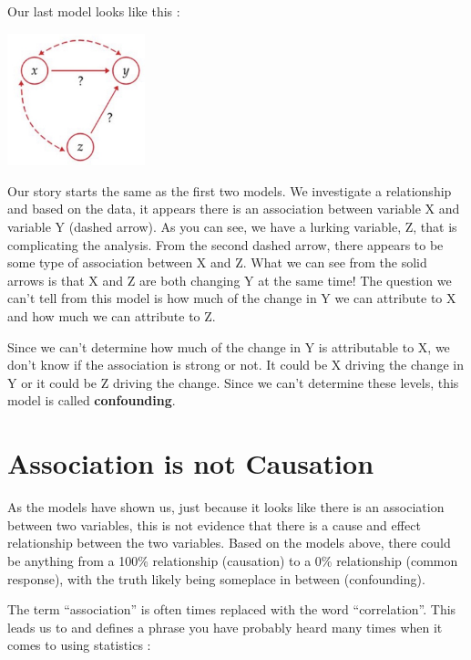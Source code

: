 \documentclass[
  letterpaper,
  DIV=11,
  numbers=noendperiod]{scrreprt}
\begin{document}

Our last model looks like this :

\includegraphics[width=0.3\textwidth,height=\textheight]{./images/IDV_3.jpg}

Our story starts the same as the first two models. We investigate a
relationship and based on the data, it appears there is an association
between variable X and variable Y (dashed arrow). As you can see, we
have a lurking variable, Z, that is complicating the analysis. From the
second dashed arrow, there appears to be some type of association
between X and Z. What we can see from the solid arrows is that X and Z
are both changing Y at the same time! The question we can't tell from
this model is how much of the change in Y we can attribute to X and how
much we can attribute to Z.

Since we can't determine how much of the change in Y is attributable to
X, we don't know if the association is strong or not. It could be X
driving the change in Y or it could be Z driving the change. Since we
can't determine these levels, this model is called \textbf{confounding}.

\section*{Association is not
Causation}\label{association-is-not-causation}


As the models have shown us, just because it looks like there is an
association between two variables, this is not evidence that there is a
cause and effect relationship between the two variables. Based on the
models above, there could be anything from a 100\% relationship
(causation) to a 0\% relationship (common response), with the truth
likely being someplace in between (confounding).

The term ``association'' is often times replaced with the word
``correlation''. This leads us to and defines a phrase you have probably
heard many times when it comes to using statistics :
\end{document}
